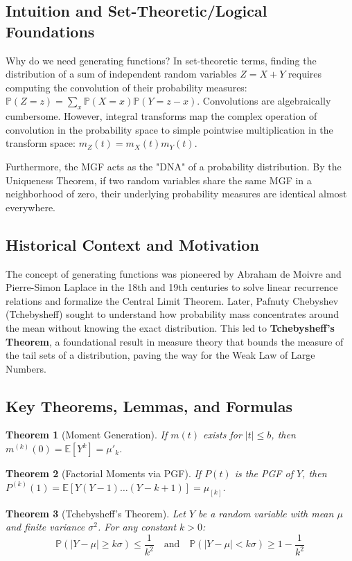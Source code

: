 \documentclass[11pt, a4paper]{article}
\newtheorem{theorem}{Theorem}[section]
\theoremstyle{definition}
\theoremstyle{remark}
\newcommand{\E}{\mathbb{E}}
\newcommand{\Prob}{\mathbb{P}}
\begin{document}
\subsection{Intuition and Set-Theoretic/Logical Foundations}
Why do we need generating functions? In set-theoretic terms, finding the distribution of a sum of independent random variables $Z = X + Y$ requires computing the convolution of their probability measures: $\Prob(Z = z) = \sum_{x} \Prob(X = x)\Prob(Y = z - x)$. Convolutions are algebraically cumbersome. However, integral transforms map the complex operation of convolution in the probability space to simple pointwise multiplication in the transform space: $m_Z(t) = m_X(t)m_Y(t)$. 

Furthermore, the MGF acts as the "DNA" of a probability distribution. By the Uniqueness Theorem, if two random variables share the same MGF in a neighborhood of zero, their underlying probability measures are identical almost everywhere.

\subsection{Historical Context and Motivation}
The concept of generating functions was pioneered by Abraham de Moivre and Pierre-Simon Laplace in the 18th and 19th centuries to solve linear recurrence relations and formalize the Central Limit Theorem. Later, Pafnuty Chebyshev (Tchebysheff) sought to understand how probability mass concentrates around the mean without knowing the exact distribution. This led to \textbf{Tchebysheff's Theorem}, a foundational result in measure theory that bounds the measure of the tail sets of a distribution, paving the way for the Weak Law of Large Numbers.

\subsection{Key Theorems, Lemmas, and Formulas}
\begin{theorem}[Moment Generation]
If $m(t)$ exists for $|t| \le b$, then $m^{(k)}(0) = \E[Y^k] = \mu'_k$.
\end{theorem}

\begin{theorem}[Factorial Moments via PGF]
If $P(t)$ is the PGF of $Y$, then $P^{(k)}(1) = \E[Y(Y-1)\dots(Y-k+1)] = \mu_{[k]}$.
\end{theorem}

\begin{theorem}[Tchebysheff's Theorem]
Let $Y$ be a random variable with mean $\mu$ and finite variance $\sigma^2$. For any constant $k > 0$:
\[ \Prob(|Y - \mu| \ge k\sigma) \le \frac{1}{k^2} \quad \text{and} \quad \Prob(|Y - \mu| < k\sigma) \ge 1 - \frac{1}{k^2} \]
\end{theorem}
\end{document}
